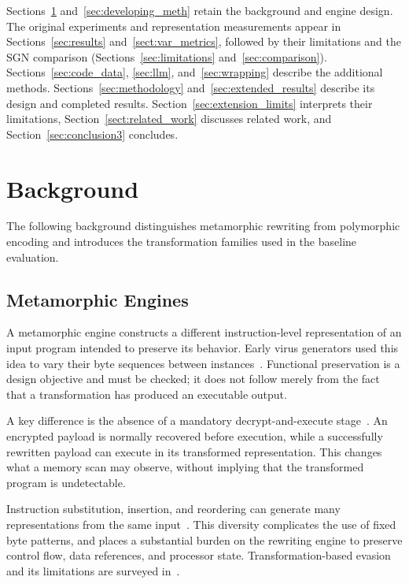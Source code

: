 \documentclass[runningheads]{llncs}
\begin{document}
Sections~\ref{sec:background} and~\ref{sec:developing_meth} retain
the background and engine design. The original experiments and
representation measurements appear in Sections~\ref{sec:results}
and~\ref{sect:var_metrics}, followed by their limitations and the SGN
comparison (Sections~\ref{sec:limitations} and~\ref{sec:comparison}).
Sections~\ref{sec:code_data}, \ref{sec:llm}, and~\ref{sec:wrapping}
describe the additional methods. Sections~\ref{sec:methodology}
and~\ref{sec:extended_results} describe its design and completed results.
Section~\ref{sec:extension_limits} interprets their limitations,
Section~\ref{sect:related_work} discusses related work, and
Section~\ref{sec:conclusion3} concludes.

\section{Background}\label{sec:background}

The following background distinguishes metamorphic rewriting from polymorphic encoding and introduces the transformation families used in the baseline evaluation.

\subsection{Metamorphic Engines}\label{sub:meth}
A metamorphic engine constructs a different instruction-level representation of an input program intended to preserve its behavior. Early virus generators used this idea to vary their byte sequences between instances~\cite{historycodeobf}. Functional preservation is a design objective and must be checked; it does not follow merely from the fact that a transformation has produced an executable output.

A key difference is the absence of a mandatory decrypt-and-execute stage~\cite{identifyingmeth}. An encrypted payload is normally recovered before execution, while a successfully rewritten payload can execute in its transformed representation. This changes what a memory scan may observe, without implying that the transformed program is undetectable.

Instruction substitution, insertion, and reordering can generate many representations from the same input~\cite{identifyingmeth,metworm}. This diversity complicates the use of fixed byte patterns, and places a substantial burden on the rewriting engine to preserve control flow, data references, and processor state. Transformation-based evasion and its limitations are surveyed in~\cite{PEsurveybible}.
\end{document}
